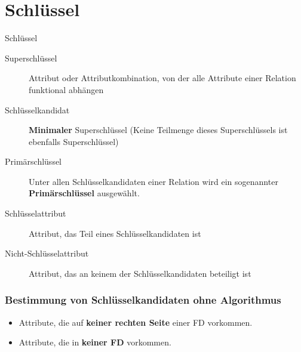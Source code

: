 \documentclass{lehramt-informatik-haupt}
\begin{document}
%

\chapter{Schlüssel}

\begin{lernkartei}{Schlüssel}
\begin{description}
\item[Superschlüssel] Attribut oder Attributkombination, von
der alle Attribute einer Relation funktional abhängen

\item[Schlüsselkandidat] \textbf{Minimaler} Superschlüssel
(Keine Teilmenge dieses Superschlüssels ist ebenfalls Superschlüssel)

\item[Primärschlüssel] Unter allen Schlüsselkandidaten einer
Relation wird ein sogenannter \textbf{Primärschlüssel} ausgewählt.

\item[Schlüsselattribut] Attribut, das Teil eines
Schlüsselkandidaten ist

\item[Nicht-Schlüsselattribut] Attribut, das an keinem der
Schlüsselkandidaten beteiligt ist
\end{description}
\end{lernkartei}

%

\subsection{Bestimmung von Schlüsselkandidaten ohne Algorithmus}

\begin{itemize}
\item Attribute, die auf \textbf{keiner rechten Seite} einer FD
vorkommen.

\item Attribute, die in \textbf{keiner FD} vorkommen.
\end{itemize}

%
\end{document}
